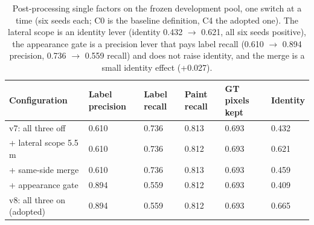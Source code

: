 \documentclass[journal]{IEEEtran}
\begin{document}
\begin{table}[!t]
\centering
\caption{Post-processing single factors on the frozen development pool, one switch at a time (six seeds each; C0 is the baseline definition, C4 the adopted one). The lateral scope is an identity lever (identity 0.432 $\rightarrow$ 0.621, all six seeds positive), the appearance gate is a precision lever that pays label recall (0.610 $\rightarrow$ 0.894 precision, 0.736 $\rightarrow$ 0.559 recall) and does not raise identity, and the merge is a small identity effect (+0.027).}
\begin{tabular}{@{}llllll@{}}
\toprule
Configuration & Label precision & Label recall & Paint recall & GT pixels kept & Identity \\
\midrule
v7: all three off & 0.610 & 0.736 & 0.813 & 0.693 & 0.432 \\
+ lateral scope 5.5 m & 0.610 & 0.736 & 0.812 & 0.693 & 0.621 \\
+ same-side merge & 0.610 & 0.736 & 0.813 & 0.693 & 0.459 \\
+ appearance gate & 0.894 & 0.559 & 0.812 & 0.693 & 0.409 \\
v8: all three on (adopted) & 0.894 & 0.559 & 0.812 & 0.693 & 0.665 \\
\bottomrule
\end{tabular}
\end{table}
\end{document}
